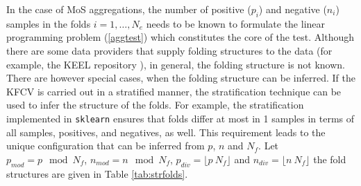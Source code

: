 \documentclass[5p, final]{elsarticle}
\begin{document}
In the case of MoS aggregations, the number of positive ($p_i$) and negative ($n_i$) samples in the folds $i=1,\dots,N_e$ needs to be known to formulate the linear programming problem (\ref{aggtest}) which constitutes the core of the test. Although there are some data providers that supply folding structures to the data (for example, the KEEL repository \cite{keel}), in general, the folding structure is not known. There are however special cases, when the folding structure can be inferred. If the KFCV is carried out in a stratified manner, the stratification technique can be used to infer the structure of the folds. For example, the stratification implemented in \verb|sklearn| \cite{sklearn} ensures that folds differ at most in 1 samples in terms of all samples, positives, and negatives, as well. This requirement leads to the unique configuration that can be inferred from $p$, $n$ and $N_f$. Let $p_{mod} = p\mod N_f$, $n_{mod} = n\mod N_f$, $p_{div} = \lfloor p \ N_f\rfloor$ and $n_{div} = \lfloor n \ N_f\rfloor$ the fold structures are given in Table \ref{tab:strfolds}.
\begin{table}
    \caption{Fold structures depending on $p_{mod}$, $n_{mod}$, $p_{div}$, $n_{div}$ by the stratified k-folding implemented in sklearn \cite{sklearn}}
    \label{tab:strfolds}
    \begin{center}
    \begin{small}
    \\
    \end{small}
    \end{center}
\end{table}
\end{document}
